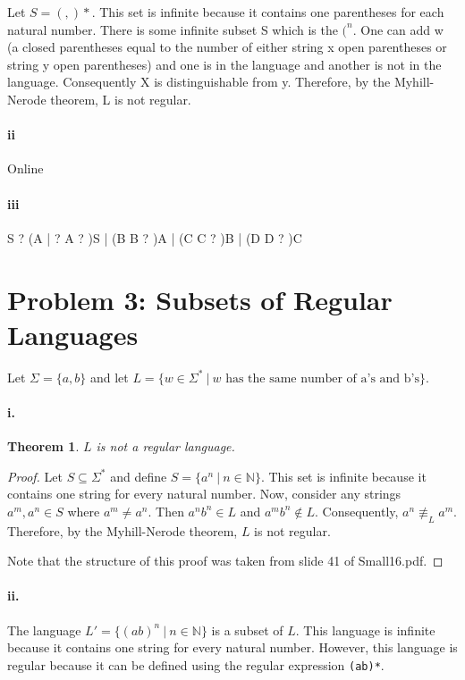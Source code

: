 \documentclass[10pt,letter]{article}
\newtheorem*{thm}{Theorem}
\begin{document}
\proof Let $S = (,)*.$ This set is infinite because it contains one parentheses for each natural number. There is some infinite subset S which is the $(^n$. One can add w (a closed parentheses equal to the number of either string x open parentheses or string y open parentheses) and one is in the language and another is not in the language.  Consequently X is distinguishable from y. Therefore, by the Myhill-Nerode theorem, L is not regular. 

\paragraph{ii}
Online

\paragraph{iii}
S ? (A | ?
A ? )S | (B
B ? )A | (C
C ? )B | (D
D ? )C

\section*{Problem 3: Subsets of Regular Languages}
Let $\Sigma = \{a, b\}$ and let $L = \{ w \in \Sigma^* \ | \ w \text{ has the same number of a's and b's} \}$. 

\paragraph{i.} 
\begin{thm} $L$ is not a regular language. \end{thm}

\begin{proof}
Let $S \subseteq \Sigma^*$ and define $S = \{a^n \ | \ n \in \mathbb{N} \}$. This set is infinite because it contains one string for every natural number. Now, consider any strings $a^m, a^n \in S$ where $a^m \not = a^n$. Then $a^n b^n \in L$ and $a^m b^n \not \in L$. Consequently, $a^n \not \equiv_L a^m$. Therefore, by the Myhill-Nerode theorem, $L$ is not regular.

Note that the structure of this proof was taken from slide 41 of Small16.pdf.
\end{proof}

\paragraph{ii.}
The language $L' = \{ (ab)^n \ | \ n \in \mathbb{N} \}$ is a subset of $L$. This language is infinite because it contains one string for every natural number. However, this language is regular because it can be defined using the regular expression \texttt{(ab)*}. 
\end{document}
